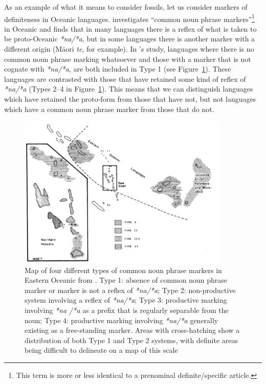 \documentclass[12pt,letterpaper]{article}
\begin{document}
As an example of what it means to consider fossils, let us consider markers of definiteness in Oceanic languages. \citet{crowley1985common} investigates ``common noun phrase markers''\footnote{This term is more or less identical to a prenominal definite/specific article.} in Oceanic and finds that in many languages there is a reflex of what is taken to be proto-Oceanic \textit{*na/*a}, but in some languages there is another marker with a different origin (M\={a}ori \textit{te}, for example). In \citeauthor{crowley1985common}'s study, languages where there is no common noun phrase marking whatsoever and those with a marker that is not cognate with \textit{*na/*a}, are both included in Type 1 (see Figure~\ref{fig:crowley_map}). These languages are contrasted with those that have retained some kind of reflex of \emph{*na/*a} (Types 2--4 in Figure~\ref{fig:crowley_map}). This means that we can distinguish languages which have retained the proto-form from those that have not, but not languages which have a common noun phrase marker from those that do not.

\begin{figure}[!ht]
\centering
\includegraphics[width=10cm]{illustrations/crowley_1985_map.png}
\caption[Map of four different types of common noun phrase markers in Eastern Oceanic from Crowley(1985).]{Map of four different types of common noun phrase markers in Eastern Oceanic from \citet[162]{crowley1985common}. Type 1: absence of common noun phrase marker or marker is not a reflex of \textit{*na/*a}; Type 2: non-productive system involving a reflex of \textit{*na/*a}; Type 3: productive marking involving \emph{*na /*a} as a prefix that is regularly separable from the noun; Type 4: productive marking involving \textit{*na/*a} generally existing as a free-standing marker. Areas with cross-hatching show a distribution of both Type 1 and Type 2 systems, with definite areas being difficult to delineate on a map of this scale}
\label{fig:crowley_map}
\end{figure}
\end{document}
